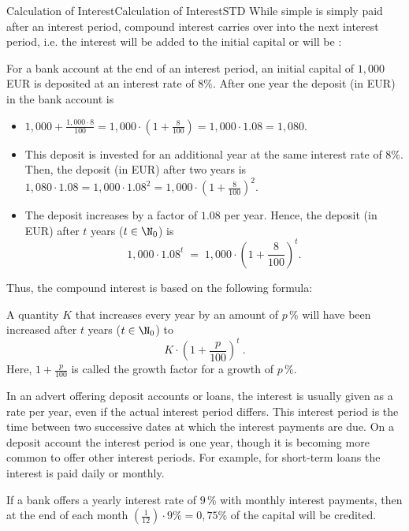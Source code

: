 \begin{MXContent}{Calculation of Interest}{Calculation of Interest}{STD}
While simple is simply paid after an interest period,  
compound interest carries over into the next interest period, i.e. the interest will be 
added to the initial capital or will be :

\begin{MExample}
For a bank account at the end of an interest period, an initial capital of $1{,}000$ EUR is deposited 
at an interest rate of $8\%$. After one year the deposit (in EUR) in the bank account is 
\begin{itemize}
\item{$1{,}000+\frac{1{,}000\cdot 8}{100}=1{,}000\cdot \left(1+\frac{8}{100} \right)=1{,}000\cdot 1.08=1{,}080$.}
\item{This deposit is invested for an additional year at the same interest rate of $8\%$. Then, the deposit (in EUR) 
after two years is $1{,}080\cdot 1.08=1{,}000\cdot 1.08^{2}=1{,}000\cdot \left( 1+\frac{8}{100}\right)^{2}$.}
\item{The deposit increases by a factor of $1.08$ per year. Hence, the deposit (in EUR) after $t$ years ($t\in\N_0$) is
$$
1{,}000\cdot 1.08^{t} \; =\; 1{,}000\cdot \left( 1+\frac{8}{100}\right)^{t}.
$$}
\end{itemize}
\end{MExample}

Thus, the compound interest is based on the following formula:

\begin{MInfo}
A quantity $K$ that increases every year by an amount of $p\,\%$ will have been increased after $t$ years ($t\in \N_0$) to
$$
K\cdot \left( 1+ \frac{p}{100}\right)^{t}\: .
$$
Here, $1+\frac{p}{100}$ is called the growth factor for a growth of $p\,\%$.
\end{MInfo}

In an advert offering deposit accounts or loans, the interest is usually given as a rate per year, even if the 
actual interest period differs. This interest period is the time between two successive dates at which the interest payments 
are due. On a deposit account the interest period is one year, though it is becoming more common to offer 
other interest periods. For example, for short-term loans the interest is paid daily or monthly.

If a bank offers a yearly interest rate of $9\,\%$ with monthly interest payments, then 
at the end of each month $\left(\frac{1}{12} \right)\cdot 9\% =0,75\%$ of the capital 
will be credited.  


\end{MXContent}
